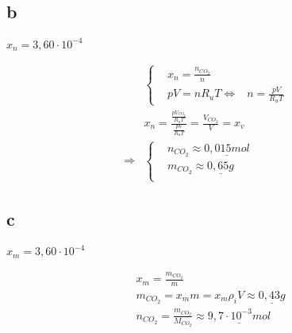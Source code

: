 \documentclass[12pt,a4paper,finnish]{article}
\begin{document}
\subsection{b}

\begin{math}
 x_n = 3,60 \cdot 10^{-4}
\end{math}

\begin{align}
&\left\{
 \begin{aligned}
  &x_n = \frac{n_{CO_2}}{n}\\
  &pV = nR_uT \Leftrightarrow &n = \frac{pV}{R_uT}
 \end{aligned}\right.\\
 &x_n = \frac{\frac{pV_{CO_2}}{R_uT}}{\frac{pV}{R_uT}} = \frac{V_{CO_2}}{V} = x_v\\
 \Rightarrow 
&\left\{
 \begin{aligned}& n_{CO_2} \approx \underline{0,015 mol}\\
 &m_{CO_2} \approx \underline{0,65g}\\
 \end{aligned}\right.
\end{align}

\subsection{c}

\begin{math}
 x_m = 3,60 \cdot 10^{-4}
\end{math}

\begin{align}
 &x_m = \frac{m_{CO_2}}{m}\\
 &m_{CO_2} = x_mm = x_m\rho_iV \approx \underline{0,43g}\\
 &n_{CO_2} = \frac{m_{CO_2}}{M_{CO_2}} \approx \underline{9,7 \cdot 10^{-3} mol}
\end{align}
\end{document}
